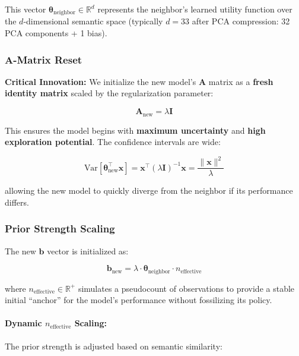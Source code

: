 \documentclass[sigconf]{acmart}
\begin{document}
This vector $\boldsymbol{\theta}_{\text{neighbor}} \in \mathbb{R}^d$ represents the neighbor's learned utility function over the $d$-dimensional semantic space (typically $d=33$ after PCA compression: 32 PCA components + 1 bias).

\subsubsection{A-Matrix Reset}

\textbf{Critical Innovation:} We initialize the new model's $\mathbf{A}$ matrix as a \textbf{fresh identity matrix} scaled by the regularization parameter:

\begin{equation}
\mathbf{A}_{\text{new}} = \lambda \mathbf{I}
\label{eq:A_reset}
\end{equation}

This ensures the model begins with \textbf{maximum uncertainty} and \textbf{high exploration potential}. The confidence intervals are wide:

\begin{equation}
\text{Var}[\boldsymbol{\theta}_{\text{new}}^\top \mathbf{x}] = \mathbf{x}^\top (\lambda \mathbf{I})^{-1} \mathbf{x} = \frac{\|\mathbf{x}\|^2}{\lambda}
\end{equation}

allowing the new model to quickly diverge from the neighbor if its performance differs.

\subsubsection{Prior Strength Scaling}

The new $\mathbf{b}$ vector is initialized as:

\begin{equation}
\mathbf{b}_{\text{new}} = \lambda \cdot \boldsymbol{\theta}_{\text{neighbor}} \cdot n_{\text{effective}}
\label{eq:b_initialization}
\end{equation}

where $n_{\text{effective}} \in \mathbb{R}^+$ simulates a pseudocount of observations to provide a stable initial ``anchor'' for the model's performance without fossilizing its policy.

\paragraph{Dynamic $n_{\text{effective}}$ Scaling:}
The prior strength is adjusted based on semantic similarity:
\end{document}
